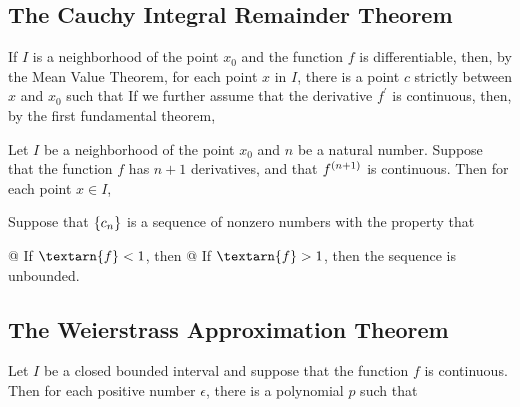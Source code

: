     \begin{thm}[Corollary]
    \end{thm}

    \subsection{The Cauchy Integral Remainder Theorem}
    If $I$ is a neighborhood of the point $x_0$ and the function $f$ is differentiable, then, by the Mean Value Theorem,
    for each point $x$ in $I$, there is a point $c$ strictly between $x$ and $x_0$ such that
    If we further assume that the derivative $f^\prime$ is continuous, then, by the first fundamental theorem,

    \begin{thm}
        Let $I$ be a neighborhood of the point $x_0$ and $n$ be a natural number. Suppose that the function $f$ has
        $n+1$ derivatives, and that $f^{\left( n+1 \right)}$ is continuous. Then for each point $x \in I$,
    \end{thm}

    \begin{thm}
        Suppose that ${\left\{ c_n \right\}}$ is a sequence of nonzero numbers with the property that
        \begin{easylist}[enumerate]
            @ If $\textarn{f} < 1$, then
            @ If $\textarn{f} > 1$, then the sequence is unbounded.
        \end{easylist}
    \end{thm}

    \subsection{The Weierstrass Approximation Theorem}
    \begin{thm}
        Let $I$ be a closed bounded interval and suppose that the function $f$ is continuous. Then for each positive
        number $\epsilon$, there is a polynomial $p$ such that
    \end{thm}

